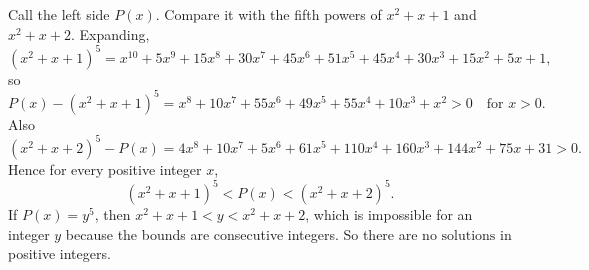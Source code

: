 Call the left side $P(x)$. Compare it with the fifth powers of $x^2+x+1$ and $x^2+x+2$. Expanding,
\[(x^2+x+1)^5=x^{10}+5x^9+15x^8+30x^7+45x^6+51x^5+45x^4+30x^3+15x^2+5x+1,\]
so
\[P(x)-(x^2+x+1)^5=x^8+10x^7+55x^6+49x^5+55x^4+10x^3+x^2>0\quad\text{for }x>0 .\]
Also
\[(x^2+x+2)^5-P(x)=4x^8+10x^7+5x^6+61x^5+110x^4+160x^3+144x^2+75x+31>0 .\]
Hence for every positive integer $x$,
\[(x^2+x+1)^5<P(x)<(x^2+x+2)^5 .\]
If $P(x)=y^5$, then $x^2+x+1<y<x^2+x+2$, which is impossible for an integer $y$ because the bounds are consecutive integers. So there are $\boxed{\text{no solutions}}$ in positive integers.
